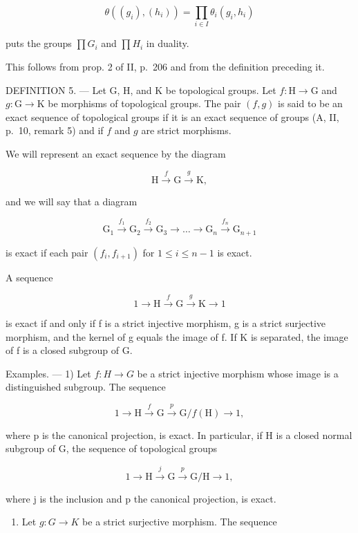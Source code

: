 \[
\theta ((g _ {i}), (h _ {i})) = \prod_ {i \in I} \theta_ {i} (g _ {i}, h _ {i})
\]

puts the groups \(\prod G_{i}\) and \(\prod H_{i}\) in duality.

This follows from prop. 2 of II, p.~206 and from the definition preceding it.

DEFINITION 5. --- Let G, H, and K be topological groups. Let \(f: \mathrm{H} \to \mathrm{G}\) and \(g: \mathrm{G} \to \mathrm{K}\) be morphisms of topological groups. The pair \((f, g)\) is said to be an exact sequence of topological groups if it is an exact sequence of groups (A, II, p.~10, remark 5) and if \(f\) and \(g\) are strict morphisms.

We will represent an exact sequence by the diagram

\[
\mathrm{H} \xrightarrow {f} \mathrm{G} \xrightarrow {g} \mathrm{K},
\]

and we will say that a diagram

\[
\mathrm{G} _ {1} \xrightarrow {f _ {1}} \mathrm{G} _ {2} \xrightarrow {f _ {2}} \mathrm{G} _ {3} \rightarrow \dots \rightarrow \mathrm{G} _ {n} \xrightarrow {f _ {n}} \mathrm{G} _ {n + 1}
\]

is exact if each pair \((f_i, f_{i+1})\) for \(1 \leqslant i \leqslant n-1\) is exact.

A sequence

\[
1 \to \mathrm{H} \xrightarrow {f} \mathrm{G} \xrightarrow {g} \mathrm{K} \to 1
\]

is exact if and only if f is a strict injective morphism, g is a strict surjective morphism, and the kernel of g equals the image of f. If K is separated, the image of f is a closed subgroup of G.

Examples. --- 1) Let \(f\colon H \to G\) be a strict injective morphism whose image is a distinguished subgroup. The sequence

\[
1 \to \mathrm{H} \xrightarrow {f} \mathrm{G} \xrightarrow {p} \mathrm{G} / f (\mathrm{H}) \to 1,
\]

where p is the canonical projection, is exact. In particular, if H is a closed normal subgroup of G, the sequence of topological groups

\[
1 \to \mathrm{H} \xrightarrow {j} \mathrm{G} \xrightarrow {p} \mathrm{G} / \mathrm{H} \to 1,
\]

where j is the inclusion and p the canonical projection, is exact.

\begin{enumerate}
\def\labelenumi{\arabic{enumi})}
\setcounter{enumi}{1}
\tightlist
\item
  Let \(g: G \rightarrow K\) be a strict surjective morphism. The sequence
\end{enumerate}


